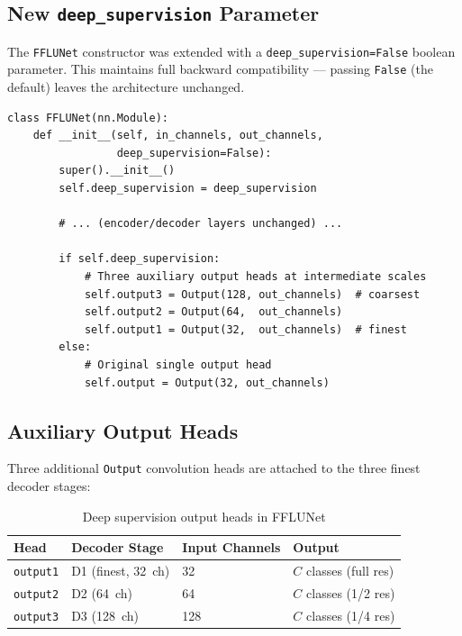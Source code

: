 \documentclass[12pt,a4paper]{report}
\begin{document}
\subsection{New \texttt{deep\_supervision} Parameter}

The \texttt{FFLUNet} constructor was extended with a \texttt{deep\_supervision=False} boolean parameter. This maintains full backward compatibility — passing \texttt{False} (the default) leaves the architecture unchanged.

\begin{lstlisting}[caption={FFLUNet \_\_init\_\_ with deep supervision parameter}, label={lst:fflunet_init}]
class FFLUNet(nn.Module):
    def __init__(self, in_channels, out_channels,
                 deep_supervision=False):
        super().__init__()
        self.deep_supervision = deep_supervision

        # ... (encoder/decoder layers unchanged) ...

        if self.deep_supervision:
            # Three auxiliary output heads at intermediate scales
            self.output3 = Output(128, out_channels)  # coarsest
            self.output2 = Output(64,  out_channels)
            self.output1 = Output(32,  out_channels)  # finest
        else:
            # Original single output head
            self.output = Output(32, out_channels)
\end{lstlisting}

\subsection{Auxiliary Output Heads}

Three additional \texttt{Output} convolution heads are attached to the three finest decoder stages:

\begin{table}[H]
\centering
\caption{Deep supervision output heads in FFLUNet}
\label{tab:ds_heads}
\begin{tabular}{llll}
\toprule
\textbf{Head} & \textbf{Decoder Stage} & \textbf{Input Channels} & \textbf{Output} \\
\midrule
\texttt{output1} & D1 (finest, 32~ch) & 32 & $C$ classes (full res) \\
\texttt{output2} & D2 (64~ch) & 64 & $C$ classes (1/2 res) \\
\texttt{output3} & D3 (128~ch) & 128 & $C$ classes (1/4 res) \\
\bottomrule
\end{tabular}
\end{table}
\end{document}
